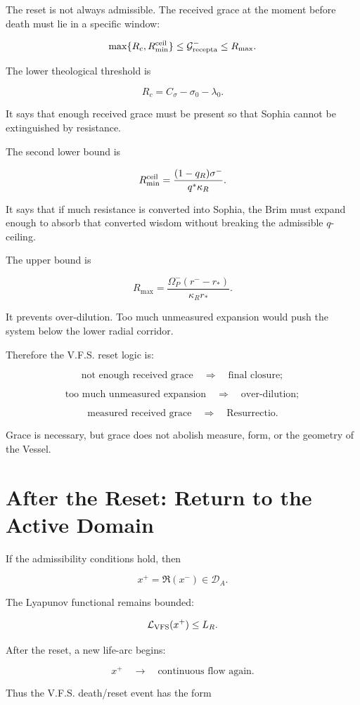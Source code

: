 \documentclass[11pt]{article}
\newcommand{\DA}{\mathcal D_A}
\newcommand{\Grec}{\mathcal G_{\rm recepta}}
\newcommand{\Om}{\Omega_P}
\newcommand{\Lvfs}{\mathcal L_{\rm VFS}}
\begin{document}
The reset is not always admissible. The received grace at the moment before death must lie in a specific window:

\[
\max\{R_c,R_{\min}^{\rm ceil}\}
\le
\Grec^-
\le
R_{\max}.
\]

The lower theological threshold is

\[
R_c=C_\sigma-\sigma_0-\lambda_0.
\]

It says that enough received grace must be present so that Sophia cannot be extinguished by resistance.

The second lower bound is

\[
R_{\min}^{\rm ceil}
=
\frac{(1-q_R)\sigma^-}{q^*\kappa_R}.
\]

It says that if much resistance is converted into Sophia, the Brim must expand enough to absorb that converted wisdom without breaking the admissible \(q\)-ceiling.

The upper bound is

\[
R_{\max}
=
\frac{\Om^-(r^--r_*)}{\kappa_R r_*}.
\]

It prevents over-dilution. Too much unmeasured expansion would push the system below the lower radial corridor.

Therefore the V.F.S. reset logic is:

\[
\text{not enough received grace}
\quad\Longrightarrow\quad
\text{final closure};
\]

\[
\text{too much unmeasured expansion}
\quad\Longrightarrow\quad
\text{over-dilution};
\]

\[
\text{measured received grace}
\quad\Longrightarrow\quad
\text{Resurrectio}.
\]

Grace is necessary, but grace does not abolish measure, form, or the geometry of the Vessel.

\section{After the Reset: Return to the Active Domain}

If the admissibility conditions hold, then

\[
x^+=\mathfrak R(x^-)
\in \DA.
\]

The Lyapunov functional remains bounded:

\[
\Lvfs(x^+)\le L_R.
\]

After the reset, a new life-arc begins:

\[
x^+
\quad\longrightarrow\quad
\text{continuous flow again}.
\]

Thus the V.F.S. death/reset event has the form
\end{document}
